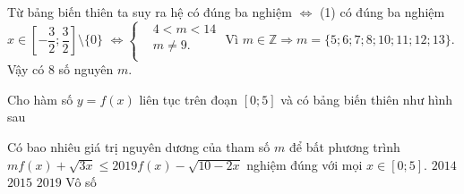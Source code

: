 \begin{ex}
{		Từ bảng biến thiên ta suy ra hệ có đúng ba nghiệm $\Leftrightarrow $ (1) có đúng ba nghiệm $ x\in \left[ -\dfrac{3}{2};\dfrac{3}{2} \right]\setminus \{0\}$ $\Leftrightarrow \left\{ \begin{aligned}
			& 4<m<14 \\ 
			& m\ne 9. \\ 
		\end{aligned} \right.$
		Vì $ m\in \mathbb{Z}\Rightarrow m=\{5;6;7;8;10;11;12;13\}$.\\
		Vậy có $8$ số nguyên $ m$.
	}
\end{ex}
\begin{ex}
	Cho hàm số $ y=f(x)$ liên tục trên đoạn $[ 0;5 ]$ và có bảng biến thiên như hình sau
	
	Có bao nhiêu giá trị nguyên dương của tham số $ m$ để bất phương trình $ mf(x)+\sqrt{3x}\le 2019f(x)-\sqrt{10-2x}$ nghiệm đúng với mọi $x\in [ 0;5 ]$.
	\choice
	{\True $2014$}
	{$2015$}
	{$2019$}
	{Vô số}
\end{ex}
